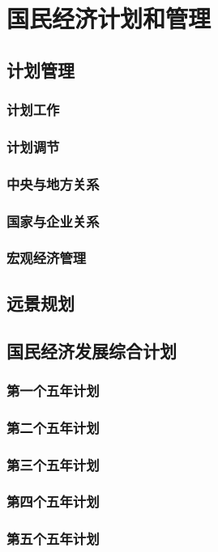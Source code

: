 \documentclass[UTF8]{../../RepresentationUniverse}
\begin{document}
\section{国民经济计划和管理}
    \subsection{计划管理}
        \subsubsection{计划工作}
        \subsubsection{计划调节}
        \subsubsection{中央与地方关系}
        \subsubsection{国家与企业关系}
        \subsubsection{宏观经济管理}
    \subsection{远景规划}
    \subsection{国民经济发展综合计划}
        \subsubsection{第一个五年计划}
        \subsubsection{第二个五年计划}
        \subsubsection{第三个五年计划}
        \subsubsection{第四个五年计划}
        \subsubsection{第五个五年计划}
\end{document}
